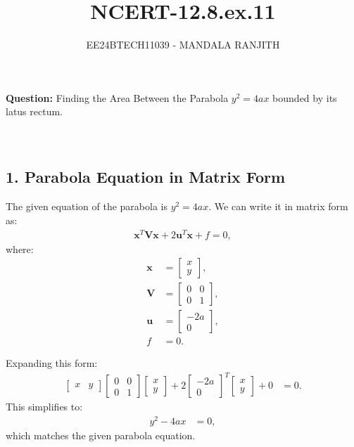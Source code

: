 \documentclass[article]{IEEEtran}
\numberwithin{figure}{enumi}
\begin{document}

\title{NCERT-12.8.ex.11}
\author{EE24BTECH11039 - MANDALA RANJITH}
{\let\newpage\relax\maketitle}
\noindent\textbf{Question: }  
Finding the Area Between the Parabola $y^2 = 4ax$ bounded by its latus rectum.\\\\
\solution\\
\subsection*{1. Parabola Equation in Matrix Form}
The given equation of the parabola is $y^2 = 4ax$. We can write it in matrix form as:
\begin{align}
\mathbf{x}^T \mathbf{V} \mathbf{x} + 2 \mathbf{u}^T \mathbf{x} + f = 0,
\end{align}
where:
\begin{align}
\mathbf{x} &= \begin{bmatrix} x \\ y \end{bmatrix}, \\
\mathbf{V} &= \begin{bmatrix} 0 & 0 \\ 0 & 1 \end{bmatrix}, \\
\mathbf{u} &= \begin{bmatrix} -2a \\ 0 \end{bmatrix}, \\
f &= 0.
\end{align}

Expanding this form:
\begin{align}
\begin{bmatrix} x & y \end{bmatrix}
\begin{bmatrix} 0 & 0 \\ 0 & 1 \end{bmatrix}
\begin{bmatrix} x \\ y \end{bmatrix}
+ 2 \begin{bmatrix} -2a \\ 0 \end{bmatrix}^T
\begin{bmatrix} x \\ y \end{bmatrix} + 0 &= 0.
\end{align}
This simplifies to:
\begin{align}
y^2 - 4ax &= 0,
\end{align}
which matches the given parabola equation.
\end{document}
